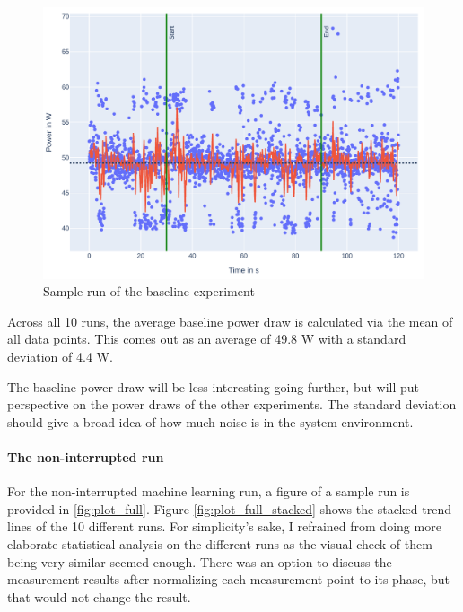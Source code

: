 \begin{figure}
    \includegraphics[width=\linewidth]{power-measurements/measurements_sleep_0714004033/plot.pdf}
    \caption{Sample run of the baseline experiment}
    \label{fig:plot_baseline}
\end{figure}

Across all 10 runs, the average baseline power draw is calculated via the mean of all data points. This comes out as an average of 49.8 W with a standard deviation of 4.4 W.

The baseline power draw will be less interesting going further, but will put perspective on the power draws of the other experiments. The standard deviation should give a broad idea of how much noise is in the system environment.

\paragraph{The non-interrupted run}

For the non-interrupted machine learning run, a figure of a sample run is provided in \ref{fig:plot_full}. 
Figure \ref{fig:plot_full_stacked} shows the stacked trend lines of the 10 different runs.
For simplicity's sake, I refrained from doing more elaborate statistical analysis on the different runs as the visual check of them being very similar seemed enough. 
There was an option to discuss the measurement results after normalizing each measurement point to its phase, but that would not change the result.

